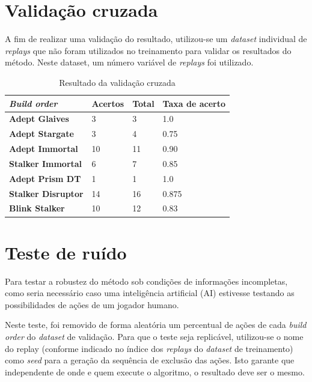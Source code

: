 		\section{Validação cruzada}
A fim de realizar uma validação do resultado, utilizou-se um \textit{dataset} individual de \textit{replays} que não foram utilizados no treinamento para validar os resultados do método. Neste dataset, um número variável de \textit{replays} foi utilizado.

\begin{table}[H]
\centering
\caption{Resultado da validação cruzada}
\label{tab:resultados-cruzada}
\begin{tabular}{l|l|l|l}
	\textit{Build order} 		& Acertos 	& Total & Taxa de acerto 	\\ \hline
	\textbf{Adept Glaives} 		& 3  		& 3  	& 1.0				\\
	\textbf{Adept Stargate} 		& 3  		& 4 		& 0.75				\\
	\textbf{Adept Immortal} 		& 10 		& 11 	& 0.90				\\
	\textbf{Stalker Immortal} 	& 6  		& 7  	& 0.85				\\
	\textbf{Adept Prism DT} 		& 1  		& 1  	& 1.0				\\
	\textbf{Stalker Disruptor} 	& 14  		& 16  	& 0.875				\\
	\textbf{Blink Stalker}	 	& 10  		& 12  	& 0.83	
\end{tabular}
\end{table}

		\section{Teste de ruído}
Para testar a robustez do método sob condições de informações incompletas, como seria necessário caso uma inteligência artificial (AI) estivesse testando as possibilidades de ações de um jogador humano.

Neste teste, foi removido de forma aleatória um percentual de ações de cada \textit{build order} do \textit{dataset} de validação. Para que o teste seja replicável, utilizou-se o nome do replay (conforme indicado no índice dos \textit{replays} do \textit{dataset} de treinamento) como \textit{seed} para a geração da sequência de exclusão das ações. Isto garante que independente de onde e quem execute o algoritmo, o resultado deve ser o mesmo.

